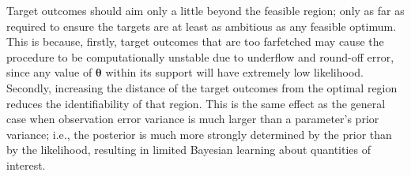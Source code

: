 \documentclass[12pt]{article}
\begin{document}
%
Target outcomes should aim only a little beyond the feasible region; only as far as required to ensure the targets are at least as ambitious as any feasible optimum.
%
This is because, 
%
firstly, target outcomes that are too farfetched may cause the procedure to be computationally unstable due to underflow and round-off error, since any value of $\boldsymbol \theta$ within its support will have extremely low likelihood.
%
Secondly, increasing the distance of the target outcomes from the optimal region reduces the identifiability of that region.
%
% 
This is the same effect as the general case when observation error variance is much larger than a parameter's prior variance; i.e., the posterior is much more strongly determined by the prior than by the likelihood, resulting in limited Bayesian learning about quantities of interest.
%
%
%


%
\end{document}
